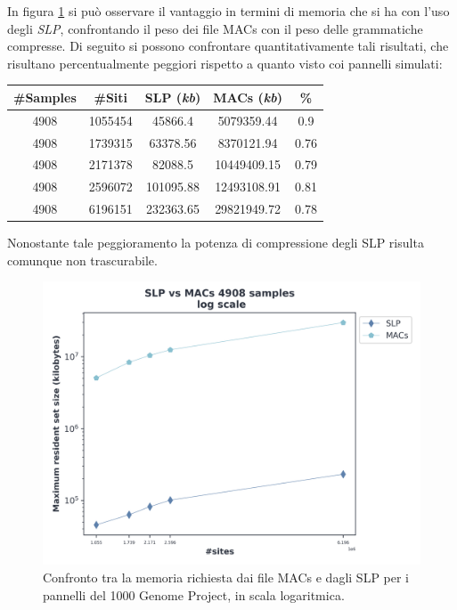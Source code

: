 In figura \ref{fig:slpmacschr} si può osservare il vantaggio in termini di
memoria che si ha con l'uso degli \textit{SLP}, confrontando il peso dei file
MACs con il peso delle grammatiche compresse. Di seguito si possono confrontare
quantitativamente tali risultati, che risultano percentualmente peggiori
rispetto a quanto visto coi pannelli simulati:
\begin{table}[H]
  \centering
  \begin{tabular}{c|c|c|c|c}
    \textbf{\#Samples} & \textbf{\#Siti} & \textbf{SLP (\textit{kb})}
    & \textbf{MACs (\textit{kb})} & \textbf{\%}\\
    \hline
    4908 & 1055454 & 45866.4 & 5079359.44 & 0.9\\
    4908 & 1739315 & 63378.56 & 8370121.94 & 0.76\\
    4908 & 2171378 & 82088.5 & 10449409.15 & 0.79\\
    4908 & 2596072 & 101095.88 & 12493108.91 & 0.81\\
    4908 & 6196151 & 232363.65 & 29821949.72 & 0.78\\
  \end{tabular}
\end{table}
Nonostante tale peggioramento la potenza di compressione degli \textup{SLP}
risulta comunque non trascurabile.
\begin{figure}
  \centering
  \includegraphics[width=0.6\linewidth]{img/slp_vs_macs_log.png}
  \caption{Confronto tra la memoria richiesta dai file MACs e dagli SLP per i
    pannelli del 1000 Genome Project, in scala
    logaritmica.} 
  \label{fig:slpmacschr}
\end{figure}
